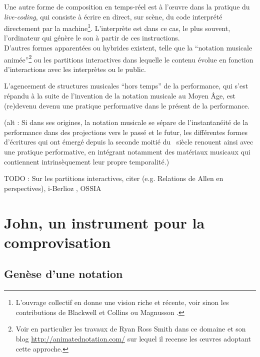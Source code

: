 \indent Une autre forme de composition en temps-réel est à l'œuvre dans la pratique du \textit{live-coding}, qui consiste à écrire en direct, sur scène, du code interprété directement par la machine\footnote{L'ouvrage collectif \cite{mclean_oxford_2018} en donne une vision riche et récente, voir sinon les contributions de Blackwell et Collins \cite{blackwell_programming_2005} ou Magnusson \cite{magnusson_algorithms_2011}.}. L'interprète est dans ce cas, le plus souvent, l'ordinateur qui génère le son à partir de ces instructions.\\
\indent D'autres formes apparentées ou hybrides existent, telle que la ``notation musicale animée''\footnote{Voir en particulier les travaux de Ryan Ross Smith \cite{smith_atomic_2015} dans ce domaine et son blog \url{http://animatednotation.com/} sur lequel il recense les œuvres adoptant cette approche.} ou les partitions interactives dans lequelle le contenu évolue en fonction d'interactions avec les interprètes ou le public.

\noindent L'agencement de structures musicales ``hors temps'' de la performance, qui s'est répandu à la suite de l'invention de la notation musicale au Moyen Âge, est (re)devenu devenu une pratique performative dans le présent de la performance.

(alt : Si dans ses origines, la notation musicale se sépare de l'instantanéité de la performance dans des projections vers le passé et le futur, les différentes formes d'écritures qui ont émergé depuis la seconde moitié du ~siècle renouent ainsi avec une pratique performative, en intégrant notamment des matériaux musicaux qui contiennent intrinsèquement leur propre temporalité.)

TODO : Sur les partitions interactives, citer \cite{desainte-catherine_interactive_2005} (e.g. Relations de Allen en perspectives), i-Berlioz \cite{miranda_i-berlioz:_2019}, OSSIA \cite{celerier_ossia:_2015}

\section{John, un instrument pour la comprovisation}

\subsection{Genèse d'une notation}

